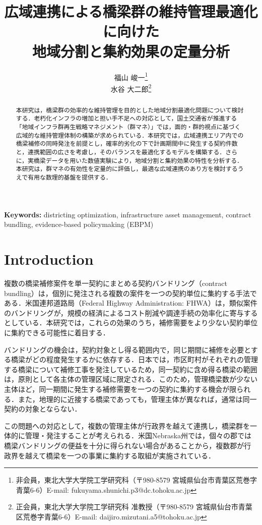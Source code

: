 \documentclass[Journal,letterpaper,InsideFigs,NoLineNumbers]{ascelike-new}
\title{広域連携による橋梁群の維持管理最適化に向けた\\地域分割と集約効果の定量分析}
\author{
福山 峻一\thanks{非会員，東北大学大学院工学研究科（〒980-8579 宮城県仙台市青葉区荒巻字青葉6-6）E-mail: fukuyama.shunichi.p3@dc.tohoku.ac.jp}\\
水谷 大二郎\thanks{正会員，東北大学大学院工学研究科 准教授（〒980-8579 宮城県仙台市青葉区荒巻字青葉6-6）E-mail: daijiro.mizutani.a5@tohoku.ac.jp}
}
\begin{document}
\maketitle

\begin{abstract}
本研究は，橋梁群の効率的な維持管理を目的とした地域分割最適化問題について検討する．老朽化インフラの増加と担い手不足への対応として，国土交通省が推進する「地域インフラ群再生戦略マネジメント（群マネ）」では，面的・群的視点に基づく広域的な維持管理体制の構築が求められている．本研究では，広域連携エリア内での橋梁補修の同時発注を前提とし，確率的劣化の下で計画期間中に発生する契約件数と，連携範囲の広さを考慮し，そのバランスを最適化するモデルを構築する．さらに，実橋梁データを用いた数値実験により，地域分割と集約効果の特性を分析する．本研究は，群マネの有効性を定量的に評価し，最適な広域連携のあり方を検討するうえで有用な数理的基盤を提供する．
\end{abstract}

\begin{center}
\textbf{Keywords:} districting optimization, infrastructure asset management,
contract bundling, evidence-based policymaking (EBPM)
\end{center}

\section{Introduction}

複数の橋梁補修案件を単一契約にまとめる契約バンドリング（contract bundling）は，個別に発注される複数の案件を一つの契約単位に集約する手法である．米国連邦道路局（Federal Highway Administration: FHWA）は，類似案件のバンドリングが，規模の経済によるコスト削減や調達手続の効率化に寄与するとしている\cite{fhwafactsheet}．本研究では，これらの効果のうち，補修需要をより少ない契約単位に集約できる可能性に着目する．

バンドリングの機会は，契約対象とし得る範囲内で，同じ期間に補修を必要とする橋梁がどの程度発生するかに依存する．日本では，市区町村がそれぞれの管理する橋梁について補修工事を発注しているため，同一契約に含め得る橋梁の範囲は，原則として各主体の管理区域に限定される．このため，管理橋梁数が少ない主体ほど，同一期間に発生する補修需要を一つの契約に集約する機会が限られる．また，地理的に近接する橋梁であっても，管理主体が異なれば，通常は同一契約の対象とならない．

この問題への対応として，複数の管理主体が行政界を越えて連携し，橋梁群を一体的に管理・発注することが考えられる．米国Nebraska州では，個々の郡では橋梁バンドリングの便益を十分に得られない場合があることから，複数郡が行政界を越えて橋梁を一つの事業に集約する取組が実施されている\cite{fhwa2019}．
\end{document}
